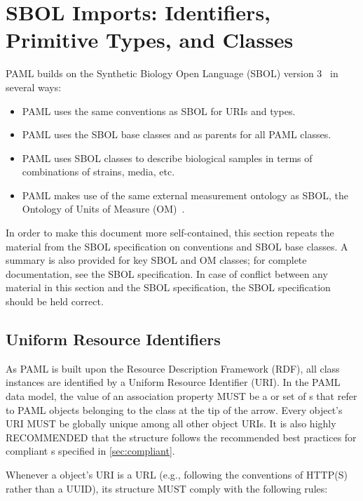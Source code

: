 \section{SBOL Imports: Identifiers, Primitive Types, and Classes}

PAML builds on the Synthetic Biology Open Language (SBOL) version 3~\citep{SBOL3} in several ways:
\begin{itemize}
\item PAML uses the same conventions as SBOL for URIs and types.
\item PAML uses the SBOL base classes  and  as parents for all PAML classes.
\item PAML uses SBOL classes to describe biological samples in terms of combinations of strains, media, etc.
\item PAML makes use of the same external measurement ontology as SBOL, the Ontology of Units of Measure (OM)~\citep{om2}.
\end{itemize}

In order to make this document more self-contained, this section repeats the material from the SBOL specification on conventions and SBOL base classes.
A summary is also provided for key SBOL and OM classes; for complete documentation, see the SBOL specification.
In case of conflict between any material in this section and the SBOL specification, the SBOL specification should be held correct.

\subsection{Uniform Resource Identifiers}
\label{sec:URIstructure}

As PAML is built upon the Resource Description Framework (RDF), all class instances are identified by a Uniform Resource Identifier (URI).  In the PAML data model, the value of an association property MUST be a  or set of s that refer to PAML objects belonging to the class at the tip of the arrow.  Every  object's URI MUST be globally unique among all other  object URIs. It is also highly RECOMMENDED that the  structure follows the recommended best practices for compliant s specified in \ref{sec:compliant}.

Whenever a  object's URI is a URL (e.g., following the conventions of HTTP(S) rather than a UUID), its structure MUST comply with the following rules:

